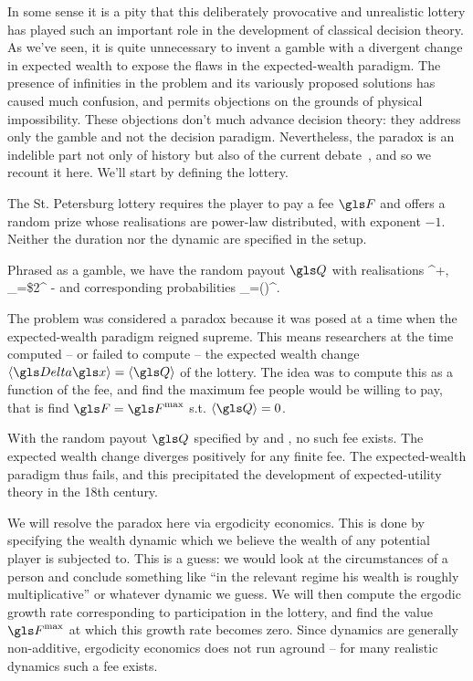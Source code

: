 In some sense it is a pity that this deliberately provocative and unrealistic lottery has played such 
an important role in the development of classical decision theory.  As we've seen, it is quite 
unnecessary to invent 
a gamble with a divergent change in expected wealth to expose the flaws in the expected-wealth 
paradigm. The presence of infinities in the problem and its variously proposed solutions has 
caused much confusion, and permits objections on the grounds of physical impossibility. These 
objections don't much advance decision theory: they address only the gamble and 
not the decision paradigm. Nevertheless, the paradox is an indelible part not only of history but 
also of the current debate~\cite{Peters2011b}, and so we recount it here. We'll start by defining 
the lottery.

The St. Petersburg lottery requires the player to pay a fee $\F$ and offers a random 
prize whose realisations are power-law distributed, with exponent $-1$. Neither the duration
nor the dynamic are specified in the setup. 

Phrased as a gamble, we have the random payout $\Q$ with realisations 
\be
\forall \gj \in {}^+, \q_{\gj}=\$2^{} -\F
{}
\ee
and corresponding probabilities 
\be
\p_\gj=\left(\right)^\gj.
\ee

The problem was considered a paradox because it was posed at a time when the 
expected-wealth paradigm reigned supreme. This means researchers at the time
computed -- or failed to compute -- the expected wealth change $\ave{\D\x}=\ave{\Q}$ 
of the lottery. 
The idea was to compute this as a function of the fee, and find the maximum 
fee people would be willing to pay, that is find 
$\F=\F^{\text{max}}$ s.t. $\ave{\Q}=0$.

With the random payout $\Q$ specified by  and , no such fee exists.
The expected wealth change diverges positively for any finite fee. The expected-wealth 
paradigm thus fails, and this precipitated the development of expected-utility theory
in the 18th century.

We will resolve the paradox here via ergodicity 
economics. This is done by specifying the wealth dynamic which we believe the wealth
of any potential player is subjected to. This is a guess: we would look at the circumstances
of a person and conclude something like ``in the relevant regime his wealth is 
roughly multiplicative'' or whatever dynamic we guess. 
We will then compute the ergodic growth rate corresponding to participation in the lottery, 
and find the value $\F^{\text{max}}$ at which
this growth rate becomes zero. Since dynamics are generally non-additive, ergodicity economics
does not run aground -- for many realistic dynamics such a fee exists.

